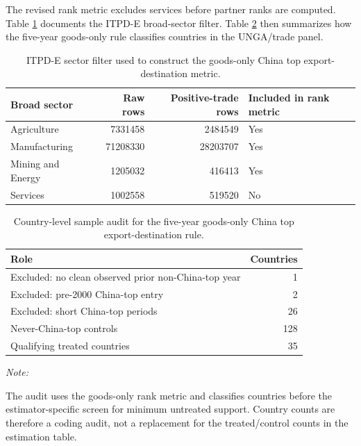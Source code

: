 \documentclass[
  12pt,
]{article}
\begin{document}
The revised rank metric excludes services before partner ranks are computed. Table \ref{tab:cross-country-sector-table} documents the ITPD-E broad-sector filter. Table \ref{tab:cross-country-audit-table} then summarizes how the five-year goods-only rule classifies countries in the UNGA/trade panel.

\begin{table}[H]
\centering
\caption{\label{tab:cross-country-sector-table}ITPD-E sector filter used to construct the goods-only China top export-destination metric.}
\centering
\fontsize{8}{10}\selectfont
\begin{tabular}[t]{lrrl}
\toprule
Broad sector & Raw rows & Positive-trade rows & Included in rank metric\\
\midrule
Agriculture & 7331458 & 2484549 & Yes\\
Manufacturing & 71208330 & 28203707 & Yes\\
Mining and Energy & 1205032 & 416413 & Yes\\
Services & 1002558 & 519520 & No\\
\bottomrule
\end{tabular}
\end{table}

\begin{table}[H]
\centering
\caption{\label{tab:cross-country-audit-table}Country-level sample audit for the five-year goods-only China top export-destination rule.}
\centering
\fontsize{8}{10}\selectfont
\begin{threeparttable}
\begin{tabular}[t]{lr}
\toprule
Role & Countries\\
\midrule
Excluded: no clean observed prior non-China-top year & 1\\
Excluded: pre-2000 China-top entry & 2\\
Excluded: short China-top periods & 26\\
Never-China-top controls & 128\\
Qualifying treated countries & 35\\
\bottomrule
\end{tabular}
\begin{tablenotes}
\item \textit{Note: } 
\item The audit uses the goods-only rank metric and classifies countries before the estimator-specific screen for minimum untreated support. Country counts are therefore a coding audit, not a replacement for the treated/control counts in the estimation table.
\end{tablenotes}
\end{threeparttable}
\end{table}
\end{document}

